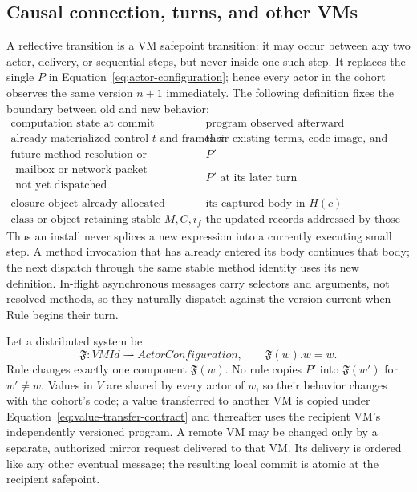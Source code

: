 \subsection{Causal connection, turns, and other VMs}

A reflective transition is a VM safepoint transition: it may occur between any
two actor, delivery, or sequential steps, but never inside one such step.  It
replaces the single $P$ in Equation~\eqref{eq:actor-configuration}; hence every
actor in the cohort observes the same version $n+1$ immediately.  The following
definition fixes the boundary between old and new behavior:
\begin{equation}\label{eq:reflection-version-observation}
\begin{array}{c|c}
\text{computation state at commit}&\text{program observed afterward}\\ \hline
\text{already materialized control }t\text{ and frames }\pi
  &\text{their existing terms, code image, and control map}\\
\text{future method resolution or invocation}&P'\\
\begin{gathered}\text{mailbox or network packet}\\[-1mm]
 \text{not yet dispatched}\end{gathered}&P'\text{ at its later turn}\\
\text{closure object already allocated}&\text{its captured body in }H(c)\\
\text{class or object retaining stable }M,C,i_f&
  \text{the updated records addressed by those identities.}
\end{array}
\end{equation}
Thus an install never splices a new expression into a currently executing
small step.  A method invocation that has already entered its body continues
that body; the next dispatch through the same stable method identity uses its
new definition.  In-flight asynchronous messages carry selectors and
arguments, not resolved methods, so they naturally dispatch against the
version current when Rule  begins their turn.

Let a distributed system be
\begin{equation}\label{eq:vm-family}
 \mathfrak F:\mathit{VMId}\rightharpoonup\mathit{ActorConfiguration},
 \qquad \mathfrak F(w).w=w.
\end{equation}
Rule  changes exactly one component
$\mathfrak F(w)$.  No rule copies $P'$ into $\mathfrak F(w')$ for $w'\ne w$.
Values in $V$ are shared by every actor of $w$, so their behavior changes with
the cohort's code; a value transferred to another VM is copied under
Equation~\eqref{eq:value-transfer-contract} and thereafter uses the recipient
VM's independently versioned program.  A remote VM may be changed only by a
separate, authorized mirror request delivered to that VM.  Its delivery is
ordered like any other eventual message; the resulting local commit is atomic
at the recipient safepoint.

